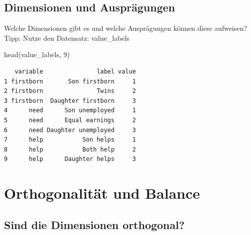 \documentclass[
  letterpaper,
  DIV=11,
  numbers=noendperiod]{scrartcl}
\newenvironment{Shaded}{\begin{snugshade}}{\end{snugshade}}
\newcommand{\DecValTok}[1]{\textcolor[rgb]{0.68,0.00,0.00}{#1}}
\newcommand{\FunctionTok}[1]{\textcolor[rgb]{0.28,0.35,0.67}{#1}}
\newcommand{\NormalTok}[1]{\textcolor[rgb]{0.00,0.23,0.31}{#1}}
\begin{document}
\subsection{Dimensionen und
Ausprägungen}\label{dimensionen-und-auspruxe4gungen}

Welche Dimensionen gibt es und welche Ausprägungen können diese
aufweisen? Tipp: Nutze den Datensatz: value\_labels

\begin{Shaded}
\begin{Highlighting}[]
\FunctionTok{head}\NormalTok{(value\_labels, }\DecValTok{9}\NormalTok{)}
\end{Highlighting}
\end{Shaded}

\begin{verbatim}
   variable               label value
1 firstborn       Son firstborn     1
2 firstborn               Twins     2
3 firstborn  Daughter firstborn     3
4      need      Son unemployed     1
5      need      Equal earnings     2
6      need Daughter unemployed     3
7      help           Son helps     1
8      help           Both help     2
9      help      Daughter helps     3
\end{verbatim}

\section{Orthogonalität und
Balance}\label{orthogonalituxe4t-und-balance}

\subsection{Sind die Dimensionen
orthogonal?}\label{sind-die-dimensionen-orthogonal}
\end{document}
